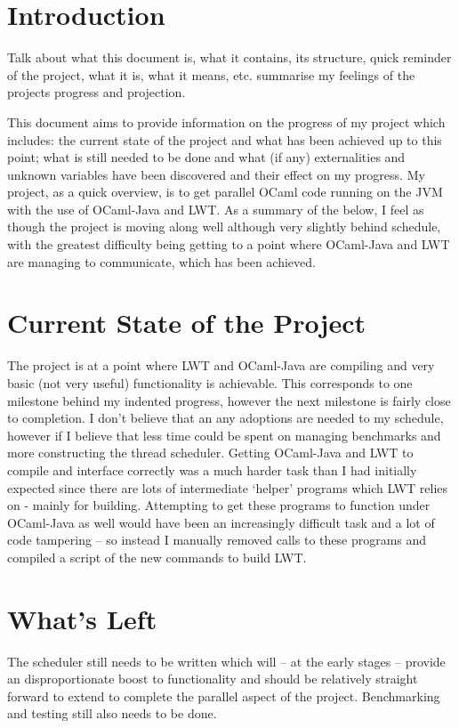 \documentclass[a4paper]{article}
\begin{document}


\section{Introduction}
Talk about what this document is, what it contains, its structure, quick reminder of the project, what it is, what it means, etc. summarise my feelings of the projects progress and projection.

This document aims to provide information on the progress of my project which includes: the current state of the project and what has been achieved up to this point; what is still needed to be done and what (if any) externalities and unknown variables have been discovered and their effect on my progress. My project, as a quick overview, is to get parallel OCaml code running on the JVM with the use of OCaml-Java and LWT. As a summary of the below, I feel as though the project is moving along well although very slightly behind schedule, with the greatest difficulty being getting to a point where OCaml-Java and LWT are managing to communicate, which has been achieved.

\section{Current State of the Project}
The project is at a point where LWT and OCaml-Java are compiling and very basic (not very useful) functionality is achievable. This corresponds to one milestone behind my indented progress, however the next milestone is fairly close to completion. I don't believe that an any adoptions are needed to my schedule, however if I believe that less time could be spent on managing benchmarks and more constructing the thread scheduler. Getting OCaml-Java and LWT to compile and interface correctly was a much harder task than I had initially expected since there are lots of intermediate `helper' programs which LWT relies on - mainly for building. Attempting to get these programs to function under OCaml-Java as well would have been an increasingly difficult task and a lot of code tampering -- so instead I manually removed calls to these programs and compiled a script of the new commands to build LWT.

\section{What's Left}
The scheduler still needs to be written which will -- at the early stages -- provide an disproportionate boost to functionality and should be relatively straight forward to extend to complete the parallel aspect of the project. Benchmarking and testing still also needs to be done.
\end{document}

